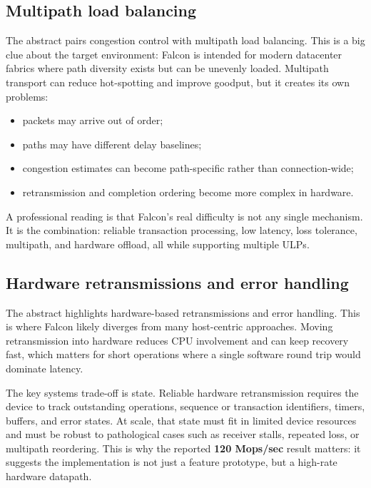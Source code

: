\documentclass[11pt]{article}
\begin{document}
\subsection{Multipath load balancing}

The abstract pairs congestion control with multipath load balancing. This is a big clue about the target environment: Falcon is intended for modern datacenter fabrics where path diversity exists but can be unevenly loaded. Multipath transport can reduce hot-spotting and improve goodput, but it creates its own problems:

\begin{itemize}
  \item packets may arrive out of order;
  \item paths may have different delay baselines;
  \item congestion estimates can become path-specific rather than connection-wide;
  \item retransmission and completion ordering become more complex in hardware.
\end{itemize}

A professional reading is that Falcon's real difficulty is not any single mechanism. It is the combination: reliable transaction processing, low latency, loss tolerance, multipath, and hardware offload, all while supporting multiple ULPs.

\subsection{Hardware retransmissions and error handling}

The abstract highlights hardware-based retransmissions and error handling. This is where Falcon likely diverges from many host-centric approaches. Moving retransmission into hardware reduces CPU involvement and can keep recovery fast, which matters for short operations where a single software round trip would dominate latency.

The key systems trade-off is state. Reliable hardware retransmission requires the device to track outstanding operations, sequence or transaction identifiers, timers, buffers, and error states. At scale, that state must fit in limited device resources and must be robust to pathological cases such as receiver stalls, repeated loss, or multipath reordering. This is why the reported \textbf{120 Mops/sec} result matters: it suggests the implementation is not just a feature prototype, but a high-rate hardware datapath.
\end{document}
